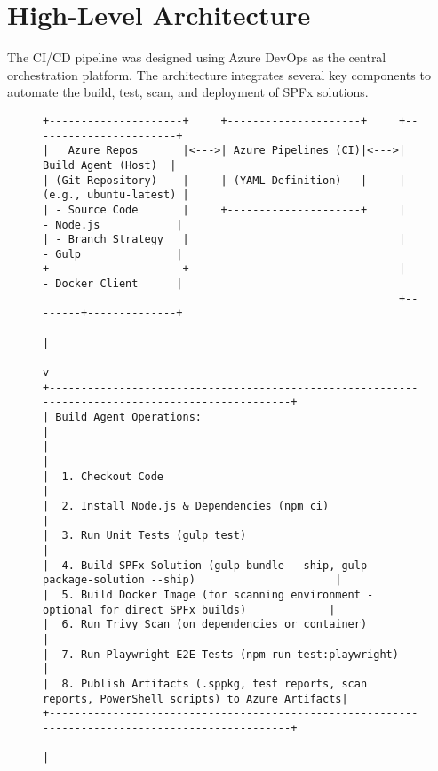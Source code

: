 \section{High-Level Architecture}
\label{sec:HighLevelArchitecture}

The CI/CD pipeline was designed using Azure DevOps as the central orchestration platform. The architecture integrates several key components to automate the build, test, scan, and deployment of SPFx solutions.

\begin{figure}[htbp]
    \centering
    \begin{verbatim}
+---------------------+     +---------------------+     +-----------------------+
|   Azure Repos       |<--->| Azure Pipelines (CI)|<--->|   Build Agent (Host)  |
| (Git Repository)    |     | (YAML Definition)   |     | (e.g., ubuntu-latest) |
| - Source Code       |     +---------------------+     |  - Node.js            |
| - Branch Strategy   |                                 |  - Gulp               |
+---------------------+                                 |  - Docker Client      |
                                                        +--------+--------------+
                                                                 |
                                                                 v
+-------------------------------------------------------------------------------------------------+
| Build Agent Operations:                                                                         |
|                                                                                                 |
|  1. Checkout Code                                                                               |
|  2. Install Node.js & Dependencies (npm ci)                                                      |
|  3. Run Unit Tests (gulp test)                                                                  |
|  4. Build SPFx Solution (gulp bundle --ship, gulp package-solution --ship)                      |
|  5. Build Docker Image (for scanning environment - optional for direct SPFx builds)             |
|  6. Run Trivy Scan (on dependencies or container)                                               |
|  7. Run Playwright E2E Tests (npm run test:playwright)                                          |
|  8. Publish Artifacts (.sppkg, test reports, scan reports, PowerShell scripts) to Azure Artifacts|
+-------------------------------------------------------------------------------------------------+
                                                                 |

\end{verbatim}
\end{figure}

